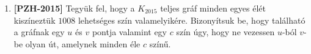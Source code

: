 \documentclass[a4paper,12pt]{article}
\begin{document}
\begin{enumerate}
        \item \textbf{[PZH-2015]} Tegyük fel, hogy a  $K_{2015}$ teljes gráf minden egyes élét kiszíneztük $1008$ lehetséges szín valamelyikére. Bizonyítsuk be, hogy található a gráfnak egy $u$ és $v$ pontja valamint egy $c$ szín úgy, hogy ne vezessen $u$-ból $v$-be olyan út, amelynek minden éle $c$ színű.

    \end{enumerate}
\end{document}
